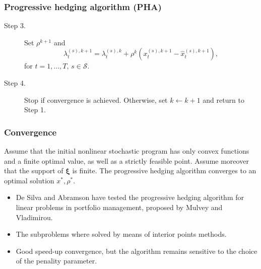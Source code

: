 \documentclass[french]{beamer}
\def\bxi{\boldsymbol\xi}
\begin{document}
\begin{frame}
\frametitle{Progressive hedging algorithm (PHA)}

\begin{description}
	\item[Step 3.]
	Set $\rho^{k+1}$ and
	\[
	\lambda_t^{(s), k+1} =  \lambda_t^{(s),k} + \rho^k \left( x_t^{(s),k+1} -  \hat{x}_t^{(s),k+1}  \right),
	\]
	for $t = 1, \dots, T, \, s \in \mathcal{S}$.
	\item[Step 4.]
	Stop if convergence is achieved.
	Otherwise, set $k \leftarrow k + 1$ and return to Step 1.
\end{description}

\end{frame}

\begin{frame}
\frametitle{Convergence}

\begin{theorem}
Assume that the initial nonlinear stochastic program has only convex functions and a finite optimal value, as well as a strictly feasible point.
Assume moreover that the support of $\bxi$ is finite.
The progressive hedging algorithm converges to an optimal solution $x^*, \rho^*$.
\end{theorem}

\begin{itemize}
\item
De Silva and Abramson have tested the progressive hedging algorithm for linear problems in portfolio management, proposed by Mulvey and Vladimirou.
\item
The subproblems where solved by means of interior points methods.
\item
Good speed-up convergence, but the algorithm remains sensitive to the choice of the penality parameter.
\end{itemize}

\end{frame}
\end{document}
